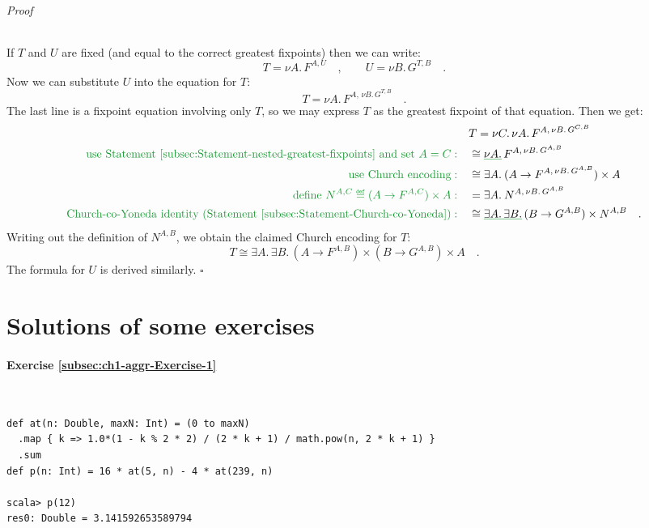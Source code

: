 \subparagraph{Proof}

If $T$ and $U$ are fixed (and equal to the correct greatest fixpoints)
then we can write:
\[
T=\nu A.\,F^{A,U}\quad,\quad\quad U=\nu B.\,G^{T,B}\quad.
\]
Now we can substitute $U$ into the equation for $T$:
\[
T=\nu A.\,F^{A,\,\nu B.\,G^{T,B}}\quad.
\]
The last line is a fixpoint equation involving only $T$, so we may
express $T$ as the greatest fixpoint of that equation. Then we get:
\begin{align*}
 & T=\nu C.\,\nu A.\,F^{A,\,\nu B.\,G^{C,B}}\\
{\color{greenunder}\text{use Statement~\ref{subsec:Statement-nested-greatest-fixpoints} and set }A=C:}\quad & \cong\gunderline{\nu A.}\,F^{A,\,\nu B.\,G^{A,B}}\\
{\color{greenunder}\text{use Church encoding}:}\quad & \cong\exists A.\:(A\rightarrow F^{A,\,\nu B.\,G^{A,B}})\times A\\
{\color{greenunder}\text{define }N^{A,C}\triangleq(A\rightarrow F^{A,C})\times A:}\quad & =\exists A.\:N^{A,\,\nu B.\,G^{A,B}}\\
{\color{greenunder}\text{Church-co-Yoneda identity (Statement~\ref{subsec:Statement-Church-co-Yoneda})}:}\quad & \cong\gunderline{\exists A.\,\exists B.}\,(B\rightarrow G^{A,B})\times N^{A,B}\quad.
\end{align*}
Writing out the definition of $N^{A,B}$, we obtain the claimed Church
encoding for $T$:
\[
T\cong\exists A.\,\exists B.\,(A\rightarrow F^{A,B})\times(B\rightarrow G^{A,B})\times A\quad.
\]
 The formula for $U$ is derived similarly. $\square$

\chapter{Solutions of some exercises}


\subsubsection*{Exercise \ref{subsec:ch1-aggr-Exercise-1}}

~
\begin{lstlisting}
def at(n: Double, maxN: Int) = (0 to maxN)
  .map { k => 1.0*(1 - k % 2 * 2) / (2 * k + 1) / math.pow(n, 2 * k + 1) }
  .sum
def p(n: Int) = 16 * at(5, n) - 4 * at(239, n)

scala> p(12)
res0: Double = 3.141592653589794
\end{lstlisting}


